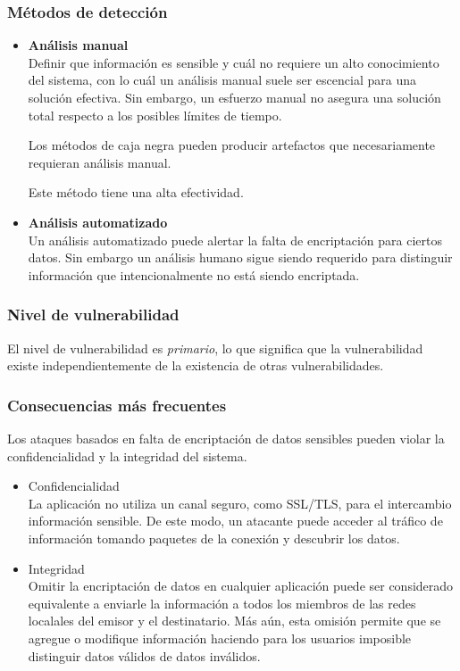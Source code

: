 \subsubsection{Métodos de detección}
\begin{itemize}
 \item \textbf{Análisis manual}\\
	Definir que información es sensible y cuál no requiere un alto conocimiento del sistema, con lo cuál un análisis manual suele ser escencial para una solución efectiva.
	Sin embargo, un esfuerzo manual no asegura una solución total respecto a los posibles límites de tiempo.

	Los métodos de caja negra pueden producir artefactos que necesariamente requieran análisis manual.

	Este método tiene una alta efectividad.
  \item \textbf{Análisis automatizado}\\
  Un análisis automatizado puede alertar la falta de encriptación para ciertos datos.
  Sin embargo un análisis humano sigue siendo requerido para distinguir información que intencionalmente no está siendo encriptada.
\end{itemize}

\subsubsection{Nivel de vulnerabilidad}

El nivel de vulnerabilidad es \textit{primario}, lo que significa que la vulnerabilidad existe independientemente de la existencia de otras vulnerabilidades.

\subsubsection{Consecuencias más frecuentes}

Los ataques basados en falta de encriptación de datos sensibles pueden violar la confidencialidad y la integridad del sistema.

\begin{itemize}
 \item Confidencialidad\\
        La aplicación no utiliza un canal seguro, como SSL/TLS, para  el intercambio información sensible.
	De este modo, un atacante puede acceder al tráfico de información tomando paquetes de la conexión y descubrir los datos.
 \item Integridad\\
        Omitir la encriptación de datos en cualquier aplicación puede ser considerado equivalente a enviarle la información a todos los miembros de las redes localales del
	emisor y el destinatario. Más aún, esta omisión permite que se agregue o modifique información haciendo para los usuarios imposible distinguir datos válidos de datos inválidos.
\end{itemize}


